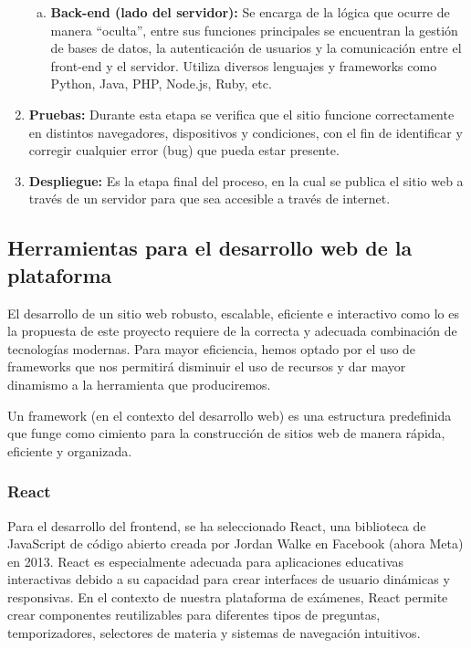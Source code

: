 \documentclass[12pt,a4paper]{report}
\begin{document}
\begin{enumerate}
\begin{enumerate}[a.]
\item \textbf{Back-end (lado del servidor):} Se encarga de la lógica que ocurre de manera ``oculta'', entre sus funciones principales se encuentran la gestión de bases de datos, la autenticación de usuarios y la comunicación entre el front-end y el servidor. Utiliza diversos lenguajes y frameworks como Python, Java, PHP, Node.js, Ruby, etc.
\end{enumerate}

\item \textbf{Pruebas:} Durante esta etapa se verifica que el sitio funcione correctamente en distintos navegadores, dispositivos y condiciones, con el fin de identificar y corregir cualquier error (bug) que pueda estar presente.

\item \textbf{Despliegue:} Es la etapa final del proceso, en la cual se publica el sitio web a través de un servidor para que sea accesible a través de internet.
\end{enumerate}

\subsection{Herramientas para el desarrollo web de la plataforma}

El desarrollo de un sitio web robusto, escalable, eficiente e interactivo como lo es la propuesta de este proyecto requiere de la correcta y adecuada combinación de tecnologías modernas. Para mayor eficiencia, hemos optado por el uso de frameworks que nos permitirá disminuir el uso de recursos y dar mayor dinamismo a la herramienta que produciremos.

Un framework (en el contexto del desarrollo web) es una estructura predefinida que funge como cimiento para la construcción de sitios web de manera rápida, eficiente y organizada.

\subsubsection{React}

Para el desarrollo del frontend, se ha seleccionado React, una biblioteca de JavaScript de código abierto creada por Jordan Walke en Facebook (ahora Meta) en 2013. React es especialmente adecuada para aplicaciones educativas interactivas debido a su capacidad para crear interfaces de usuario dinámicas y responsivas. En el contexto de nuestra plataforma de exámenes, React permite crear componentes reutilizables para diferentes tipos de preguntas, temporizadores, selectores de materia y sistemas de navegación intuitivos.
\end{document}
